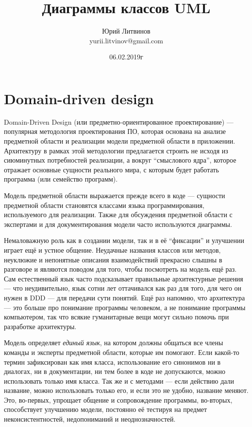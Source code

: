 \documentclass[a5paper]{article}
\title{Диаграммы классов UML}
\author{Юрий Литвинов\\\small{yurii.litvinov@gmail.com}}
\date{06.02.2019г}
\begin{document}
\maketitle
\thispagestyle{empty}

\section{Domain-driven design}

 Domain-Driven Design (или предметно-ориентированное проектирование) --- популярная методология проектирования ПО, которая основана на анализе предметной области и реализации модели предметной области в приложении. Архитектуру в рамках этой методологии предлагается строить не исходя из сиюминутных потребностей реализации, а вокруг ``смыслового ядра'', которое отражает основные сущности реального мира, с которым будет работать программа (или семейство программ).

Модель предметной области выражается прежде всего в коде --- сущности предметной области становятся классами языка программирования, используемого для реализации. Также для обсуждения предметной области с экспертами и для документирования модели часто используются диаграммы.

Немаловажную роль как в создании модели, так и в её ``фиксации'' и улучшении играет ещё и устное общение. Неудачные названия классов или методов, неуклюжие и непонятные описания взаимодействий прекрасно слышны в разговоре и являются поводом для того, чтобы посмотреть на модель ещё раз. Сам естественный язык часто подсказывает правильные архитектурные решения --- что неудивительно, язык сотни лет оттачивался как раз для того, для чего он нужен в DDD --- для передачи сути понятий. Ещё раз напомню, что архитектура --- это больше про понимание программы человеком, а не понимание программы компьютером, так что всякие гуманитарные вещи могут сильно помочь при разработке архитектуры.

Модель определяет \textit{единый язык}, на котором должны общаться все члены команды и эксперты предметной области, которые им помогают. Если какой-то термин зафиксирован как имя класса, использование его синонимов ни в диалогах, ни в документации, ни тем более в коде не допускаются, можно использовать только имя класса. Так же и с методами --- если действию дали название, можно использовать только его, и если это не удобно, название меняют. Это, во-первых, упрощает общение и сопровождение программы, во-вторых, способствует улучшению модели, постоянно её тестируя на предмет неконсистентностей, недопониманий и неоднозначностей.
\end{document}
